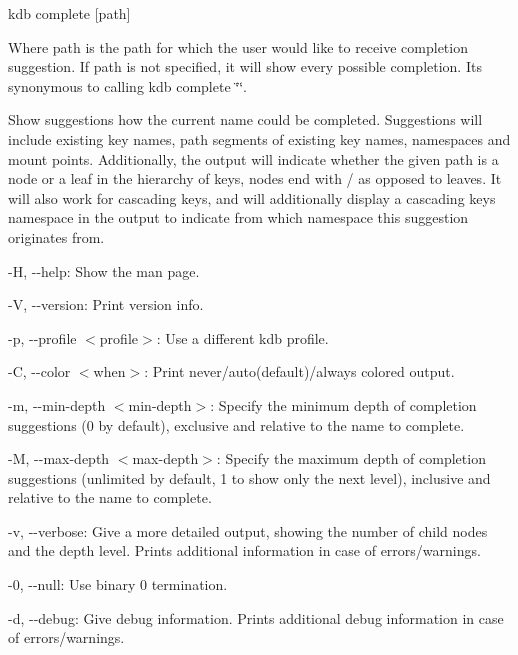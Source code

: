 {\ttfamily kdb complete \mbox{[}path\mbox{]}}

Where {\ttfamily path} is the path for which the user would like to receive completion suggestion. If {\ttfamily path} is not specified, it will show every possible completion. Its synonymous to calling {\ttfamily kdb complete \char`\"{}\char`\"{}}.

Show suggestions how the current name could be completed. Suggestions will include existing key names, path segments of existing key names, namespaces and mount points. Additionally, the output will indicate whether the given path is a node or a leaf in the hierarchy of keys, nodes end with \textquotesingle{}/\textquotesingle{} as opposed to leaves. It will also work for cascading keys, and will additionally display a cascading key\textquotesingle{}s namespace in the output to indicate from which namespace this suggestion originates from.


\begin{DoxyItemize}
\item {\ttfamily -\/H}, {\ttfamily -\/-\/help}\+: Show the man page.
\item {\ttfamily -\/V}, {\ttfamily -\/-\/version}\+: Print version info.
\item {\ttfamily -\/p}, {\ttfamily -\/-\/profile $<$profile$>$}\+: Use a different kdb profile.
\item {\ttfamily -\/C}, {\ttfamily -\/-\/color $<$when$>$}\+: Print never/auto(default)/always colored output.
\item {\ttfamily -\/m}, {\ttfamily -\/-\/min-\/depth $<$min-\/depth$>$}\+: Specify the minimum depth of completion suggestions (0 by default), exclusive and relative to the name to complete.
\item {\ttfamily -\/M}, {\ttfamily -\/-\/max-\/depth $<$max-\/depth$>$}\+: Specify the maximum depth of completion suggestions (unlimited by default, 1 to show only the next level), inclusive and relative to the name to complete.
\item {\ttfamily -\/v}, {\ttfamily -\/-\/verbose}\+: Give a more detailed output, showing the number of child nodes and the depth level. Prints additional information in case of errors/warnings.
\item {\ttfamily -\/0}, {\ttfamily -\/-\/null}\+: Use binary 0 termination.
\item {\ttfamily -\/d}, {\ttfamily -\/-\/debug}\+: Give debug information. Prints additional debug information in case of errors/warnings.
\end{DoxyItemize}



